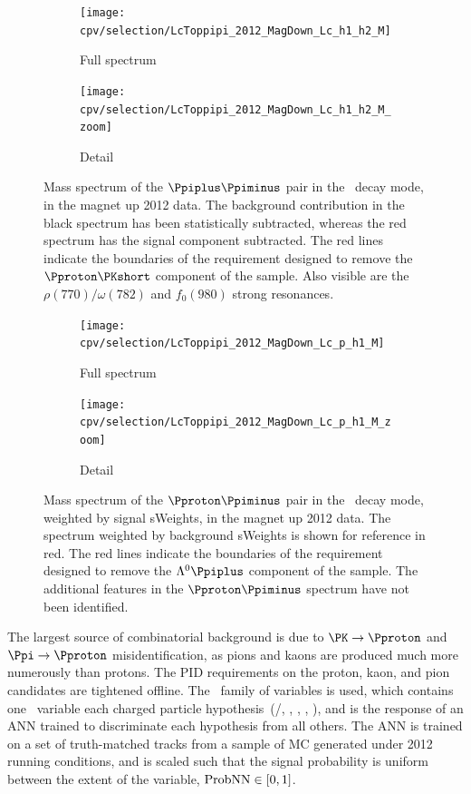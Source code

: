 \begin{figure}
  \begin{subfigure}[b]{0.5\textwidth}
    \texttt{[image: cpv/selection/LcToppipi\_2012\_MagDown\_Lc\_h1\_h2\_M]}
    \caption{Full spectrum}
    \label{fig:cpv:selection:ppipi_ks_cut:full}
  \end{subfigure}
  \begin{subfigure}[b]{0.5\textwidth}
    \texttt{[image: cpv/selection/LcToppipi\_2012\_MagDown\_Lc\_h1\_h2\_M\_zoom]}
    \caption{Detail}
    \label{fig:cpv:selection:ppipi_ks_cut:zoom}
  \end{subfigure}
  \caption{%
    Mass spectrum of the $\Ppiplus\Ppiminus$ pair in the \ppipi\ decay mode, in 
    the magnet up 2012 data.
    The background contribution in the black spectrum has been statistically 
    subtracted, whereas the red spectrum has the signal component subtracted.
    The red lines indicate the boundaries of the requirement designed to remove 
    the $\Pproton\PKshort$ component of the sample.
    Also visible are the $\rho(770)/\omega(782)$ and $f_{0}(980)$ strong 
    resonances.
  }
  \label{fig:cpv:selection:ppipi_ks_cut}
\end{figure}

\begin{figure}
  \begin{subfigure}[b]{0.5\textwidth}
    \texttt{[image: cpv/selection/LcToppipi\_2012\_MagDown\_Lc\_p\_h1\_M]}
    \caption{Full spectrum}
    \label{fig:cpv:selection:ppipi_lambda_cut:full}
  \end{subfigure}
  \begin{subfigure}[b]{0.5\textwidth}
    \texttt{[image: cpv/selection/LcToppipi\_2012\_MagDown\_Lc\_p\_h1\_M\_zoom]}
    \caption{Detail}
    \label{fig:cpv:selection:ppipi_lambda_cut:zoom}
  \end{subfigure}
  \caption{%
    Mass spectrum of the $\Pproton\Ppiminus$ pair in the \ppipi\ decay mode, 
    weighted by signal sWeights, in the magnet up 2012 data.
    The spectrum weighted by background sWeights is shown for reference in red.
    The red lines indicate the boundaries of the requirement designed to remove 
    the $\PLambda\Ppiplus$ component of the sample.
    The additional features in the $\Pproton\Ppiminus$ spectrum have not been 
    identified.
  }
  \label{fig:cpv:selection:ppipi_lambda_cut}
\end{figure}

The largest source of combinatorial background is due to $\PK \to \Pproton$ and 
$\Ppi \to \Pproton$ misidentification, as pions and kaons are produced much 
more numerously than protons.
The \ac{PID} requirements on the proton, kaon, and pion candidates are 
tightened offline.
The \probnn\ family of variables is used, which contains one \probnn\ variable 
each charged particle hypothesis~(\Pproton/\APproton, \PKpm, \Ppipm, \Pmupm, 
\Pepm), and is the response of an \ac{ANN} trained to discriminate each 
hypothesis from all others.
The \ac{ANN} is trained on a set of truth-matched tracks from a sample of 
\ac{MC} generated under 2012 running conditions, and is scaled such that the 
signal probability is uniform between the extent of the variable, 
$\text{ProbNN} \in [0, 1]$.

